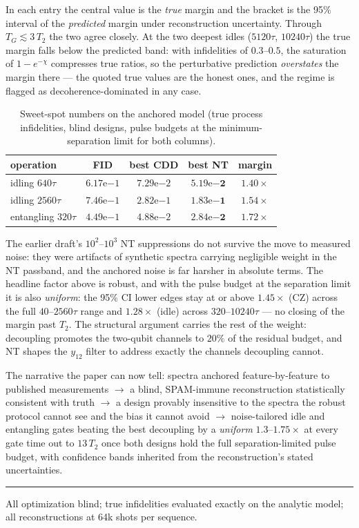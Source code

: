 \documentclass[10pt]{article}
\newcommand{\TG}{T_G}
\begin{document}
In each entry the central value is the \emph{true} margin and the bracket is
the 95\% interval of the \emph{predicted} margin under reconstruction
uncertainty. Through $\TG \lesssim 3\,T_2$ the two agree closely. At the
two deepest idles ($5120\tau$, $10240\tau$) the true margin falls below the
predicted band: with infidelities of $0.3$--$0.5$, the saturation of
$1-e^{-\chi}$ compresses true ratios, so the perturbative prediction
\emph{overstates} the margin there --- the quoted true values are the
honest ones, and the regime is flagged as decoherence-dominated in any
case.

\begin{table}[h!]
\centering\small
\begin{tabular}{lcccc}
\toprule
operation & FID & best CDD & best NT & margin \\
\midrule
idling $640\tau$ & $6.17\mathrm{e}{-1}$ & $7.29\mathrm{e}{-2}$ & $\mathbf{5.19\mathrm{e}{-2}}$ & $1.40\times$ \\
idling $2560\tau$ & $7.46\mathrm{e}{-1}$ & $2.82\mathrm{e}{-1}$ & $\mathbf{1.83\mathrm{e}{-1}}$ & $1.54\times$ \\
entangling $320\tau$ & $4.49\mathrm{e}{-1}$ & $4.88\mathrm{e}{-2}$ & $\mathbf{2.84\mathrm{e}{-2}}$ & $1.72\times$ \\
\bottomrule
\end{tabular}
\caption{Sweet-spot numbers on the anchored model (true process
infidelities, blind designs, pulse budgets at the minimum-separation
limit for both columns).}
\label{tab:regen}
\end{table}

The earlier draft's $10^2$--$10^3$ NT suppressions do not survive the move
to measured noise: they were artifacts of synthetic spectra carrying
negligible weight in the NT passband, and the anchored noise is far harsher
in absolute terms. The headline factor above is robust, and with the pulse
budget at the separation limit it is also \emph{uniform}: the 95\% CI lower
edges stay at or above $1.45\times$ (CZ) across the full $40$--$2560\tau$
range and $1.28\times$ (idle) across $320$--$10240\tau$ --- no closing of
the margin past $T_2$. The structural argument carries the rest of the
weight: decoupling promotes the two-qubit channels to $20\%$ of the
residual budget, and NT shapes the $y_{12}$ filter to address exactly the
channels decoupling cannot.

\vspace{0.3em}
The narrative the paper can now tell: spectra anchored feature-by-feature
to published measurements $\to$ a blind, SPAM-immune reconstruction
statistically consistent with truth $\to$ a design provably insensitive to
the spectra the robust protocol cannot see and the bias it cannot avoid
$\to$ noise-tailored idle and entangling gates beating the best decoupling
by a \emph{uniform} $1.3$--$1.75\times$ at every gate time out to
$13\,T_2$ once both designs hold the full separation-limited pulse budget,
with confidence bands inherited from the reconstruction's stated
uncertainties.

\vspace{0.4em}
\hrule
\vspace{0.3em}
{\footnotesize All optimization blind; true infidelities evaluated exactly on
the analytic model; all reconstructions at 64k shots per sequence.}
\end{document}
